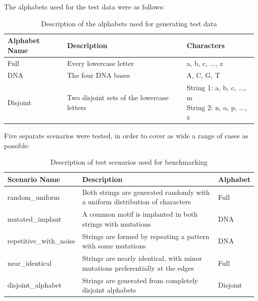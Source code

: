 The alphabets used for the test data were as follows:
\begin{table}[H]
    \renewcommand{\arraystretch}{1.5}
    \begin{tabularx}{\textwidth}{|l|X|X|}
        \hline
        \textbf{Alphabet Name} & \textbf{Description} & \textbf{Characters}\\
        \hline
        Full & Every lowercase letter & a, b, c, ..., z \\
        \hline
        DNA & The four DNA \gls{base}s & A, C, G, T \\
        \hline
        Disjoint & Two disjoint sets of the lowercase letters & \makecell[l]{String 1: a, b, c, ..., m\\String 2: n, o, p, ..., z}\\
        \hline
    \end{tabularx}
    \caption{Description of the alphabets used for generating test data}
    \label{tab:alphabets}
\end{table}

Five separate scenarios were tested, in order to cover as wide a range of cases as possible:
\begin{table}[H]
    \renewcommand{\arraystretch}{1.5}
    \begin{tabularx}{\textwidth}{|l|X|l|}
        \hline
        \textbf{Scenario Name} & \textbf{Description} & \textbf{Alphabet}\\
        \hline
        random\_uniform & Both strings are generated randomly with a uniform distribution of characters & Full \\
        \hline
        mutated\_implant & A common motif is implanted in both strings with mutations & DNA \\
        \hline
        repetitive\_with\_noise & Strings are formed by repeating a pattern with some mutations & DNA \\
        \hline
        near\_identical & Strings are nearly identical, with minor mutations preferentially at the edges & Full \\
        \hline
        disjoint\_alphabet & Strings are generated from completely disjoint alphabets & Disjoint \\
        \hline
    \end{tabularx}
    \caption{Description of test scenarios used for benchmarking}
    \label{tab:test_scenarios}
\end{table}

